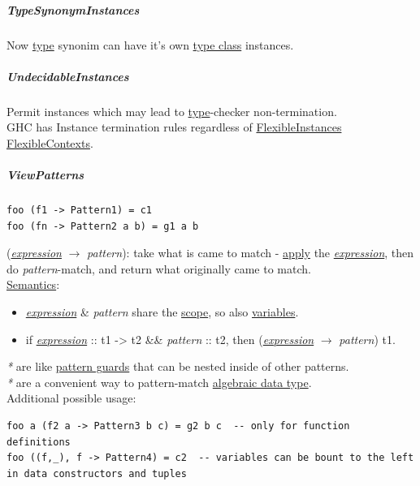 \documentclass[11pt]{article}
\begin{document}
\subparagraph{\label{org0fa5d59}TypeSynonymInstances}
\label{sec:orgad42542}
Now \hyperref[orgc4aea2f]{type} synonim can have it's own \hyperref[org16d8a26]{type class} instances.\\

\subparagraph{\label{orgf388a67}UndecidableInstances}
\label{sec:org043574e}
Permit instances which may lead to \hyperref[orgc4aea2f]{type}-checker non-termination.\\

GHC has Instance termination rules regardless of \hyperref[org8a6fe97]{FlexibleInstances} \hyperref[org62c291b]{FlexibleContexts}.\\

\subparagraph{\label{org767789e}ViewPatterns}
\label{sec:org9c26475}
\begin{verbatim}
foo (f1 -> Pattern1) = c1
foo (fn -> Pattern2 a b) = g1 a b
\end{verbatim}
(\emph{\hyperref[org9021dd7]{expression}} \(\to\) \emph{pattern}): take what is came to match - \hyperref[org644adf5]{apply} the \emph{\hyperref[org9021dd7]{expression}}, then do \emph{pattern}-match, and return what originally came to match.\\

\hyperref[orgbbcc036]{Semantics}:\\
\begin{itemize}
\item \emph{\hyperref[org9021dd7]{expression}} \& \emph{pattern} share the \hyperref[orgb3c0d1a]{scope}, so also \hyperref[orge17f54f]{variables}.\\
\item{if \emph{\hyperref[org9021dd7]{expression}} :: t1 -> t2 \&\& \emph{pattern} :: t2, then (\emph{\hyperref[org9021dd7]{expression}} \(\to\) \emph{pattern})} t1.\\
\end{itemize}

\emph{*} are like \hyperref[orgddac959]{pattern guards} that can be nested inside of other patterns.\\
\emph{*} are a convenient way to pattern-match \hyperref[org2278a14]{algebraic data type}.\\

Additional possible usage:\\
\begin{verbatim}
foo a (f2 a -> Pattern3 b c) = g2 b c  -- only for function definitions
foo ((f,_), f -> Pattern4) = c2  -- variables can be bount to the left in data constructors and tuples
\end{verbatim}
\end{document}
